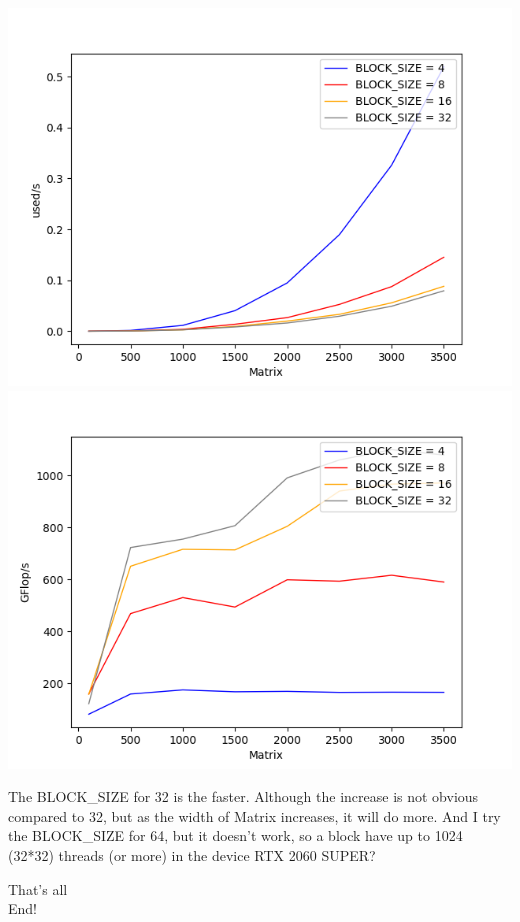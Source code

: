 \documentclass[12pt]{ctexart}
\begin{document}
\includegraphics[scale=0.5]{3s}
\includegraphics[scale=0.5]{3g}

The BLOCK\_SIZE for 32 is the faster. Although the increase is not obvious compared to 32, but as the width of Matrix increases, it will do more.
And I try the BLOCK\_SIZE for 64, but it doesn't work, so a block have up to 1024 (32*32) threads (or more) in the device RTX 2060 SUPER?


\begin{center}
    \Huge{That's all}\\
    \Huge{End!}\\
\end{center}
\end{document}
